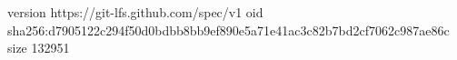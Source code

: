 version https://git-lfs.github.com/spec/v1
oid sha256:d7905122c294f50d0bdbb8bb9ef890e5a71e41ac3c82b7bd2cf7062c987ae86c
size 132951
